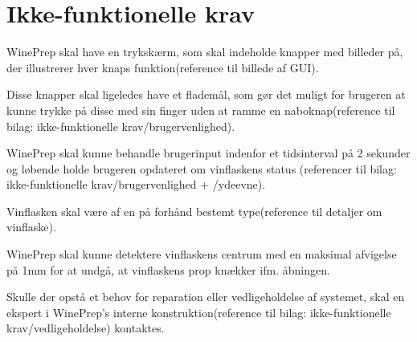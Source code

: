 \section{Ikke-funktionelle krav}
WinePrep skal have en trykskærm, som skal indeholde knapper med billeder på, der illustrerer hver knaps funktion(reference til billede af GUI).

Disse knapper skal ligeledes have et flademål, som gør det muligt for brugeren at kunne trykke på disse med sin finger uden at ramme en naboknap(reference til 
bilag: ikke-funktionelle krav/brugervenlighed).

WinePrep skal kunne behandle brugerinput indenfor et tidsinterval på 2 sekunder og løbende holde brugeren opdateret om vinflaskens status
(referencer til bilag: ikke-funktionelle krav/brugervenlighed + /ydeevne).

Vinflasken skal være af en på forhånd bestemt type(reference til detaljer om vinflaske).

WinePrep skal kunne detektere vinflaskens centrum med en maksimal afvigelse på 1mm for at undgå, at vinflaskens prop knækker ifm. åbningen.

Skulle der opstå et behov for reparation eller vedligeholdelse af systemet, skal en ekspert i WinePrep's interne konstruktion(reference til bilag: 
ikke-funktionelle krav/vedligeholdelse) kontaktes.
